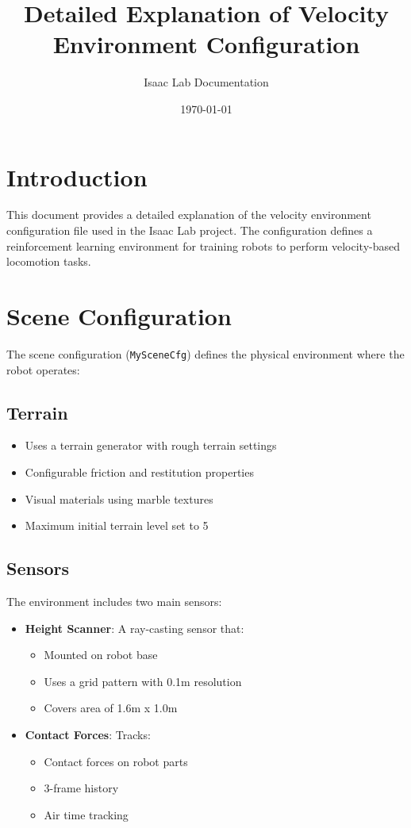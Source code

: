 \documentclass{article}
\title{Detailed Explanation of Velocity Environment Configuration}
\author{Isaac Lab Documentation}
\date{\today}
\begin{document}
\maketitle

\section{Introduction}
This document provides a detailed explanation of the velocity environment configuration file used in the Isaac Lab project. The configuration defines a reinforcement learning environment for training robots to perform velocity-based locomotion tasks.

\section{Scene Configuration}
The scene configuration (\texttt{MySceneCfg}) defines the physical environment where the robot operates:

\subsection{Terrain}
\begin{itemize}
    \item Uses a terrain generator with rough terrain settings
    \item Configurable friction and restitution properties
    \item Visual materials using marble textures
    \item Maximum initial terrain level set to 5
\end{itemize}

\subsection{Sensors}
The environment includes two main sensors:
\begin{itemize}
    \item \textbf{Height Scanner}: A ray-casting sensor that:
    \begin{itemize}
        \item Mounted on robot base
        \item Uses a grid pattern with 0.1m resolution
        \item Covers area of 1.6m x 1.0m
    \end{itemize}
    \item \textbf{Contact Forces}: Tracks:
    \begin{itemize}
        \item Contact forces on robot parts
        \item 3-frame history
        \item Air time tracking
    \end{itemize}
\end{itemize}
\end{document}
